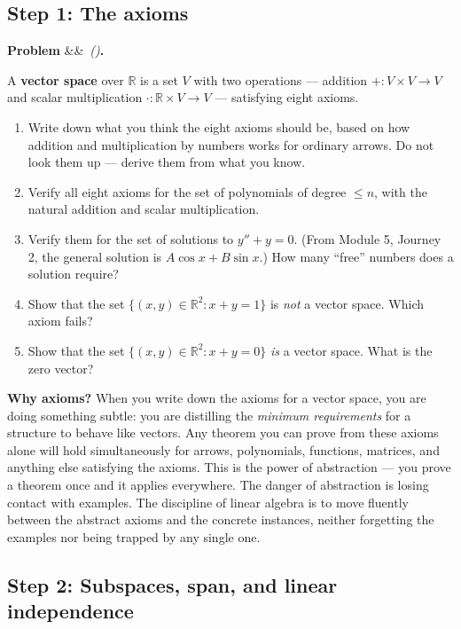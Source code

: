 \documentclass[12pt, a4paper]{article}
\newcounter{problem}
\newenvironment{problem}[1][]{%
  \refstepcounter{problem}%
  \par\vspace{6pt}%
  \noindent\textbf{\color{MidBlue}Problem \theproblem}%
  \ifx&#1&\else\ \textit{(#1)}\fi\textbf{.}\enskip
}{\par\vspace{4pt}}
\begin{document}
\subsection{Step 1: The axioms}

\begin{problem}
\label{prob:vs_axioms}
A \textbf{vector space} over $\mathbb{R}$ is a set $V$ with two operations --- addition $+: V \times V \to V$ and scalar multiplication $\cdot : \mathbb{R} \times V \to V$ --- satisfying eight axioms.

\begin{enumerate}[label=(\alph*), topsep=2pt]
  \item Write down what you think the eight axioms should be, based on how addition and multiplication by numbers works for ordinary arrows. Do not look them up --- derive them from what you know.
  \item Verify all eight axioms for the set of polynomials of degree $\leq n$, with the natural addition and scalar multiplication.
  \item Verify them for the set of solutions to $y'' + y = 0$. (From Module 5, Journey 2, the general solution is $A\cos x + B\sin x$.) How many ``free'' numbers does a solution require?
  \item Show that the set $\{(x, y) \in \mathbb{R}^2 : x + y = 1\}$ is \emph{not} a vector space. Which axiom fails?
  \item Show that the set $\{(x, y) \in \mathbb{R}^2 : x + y = 0\}$ \emph{is} a vector space. What is the zero vector?
\end{enumerate}
\end{problem}

\begin{thought}
\textbf{Why axioms?}
When you write down the axioms for a vector space, you are doing something subtle: you are distilling the \emph{minimum requirements} for a structure to behave like vectors. Any theorem you can prove from these axioms alone will hold simultaneously for arrows, polynomials, functions, matrices, and anything else satisfying the axioms. This is the power of abstraction --- you prove a theorem once and it applies everywhere. The danger of abstraction is losing contact with examples. The discipline of linear algebra is to move fluently between the abstract axioms and the concrete instances, neither forgetting the examples nor being trapped by any single one.
\end{thought}

\subsection{Step 2: Subspaces, span, and linear independence}
\end{document}
